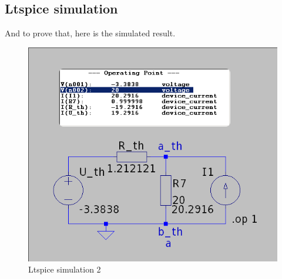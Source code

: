 \documentclass[a4paper]{article}
\begin{document}
\subsection{Ltspice simulation}
And to prove that, here is the simulated result.
\begin{figure}[h!]\centering
   \includegraphics[scale=0.5]{./Figures/ltspice_bonus.png} 
\caption{Ltspice simulation 2}
\label{fig:ltspice_5}
\end{figure}
\end{document}

